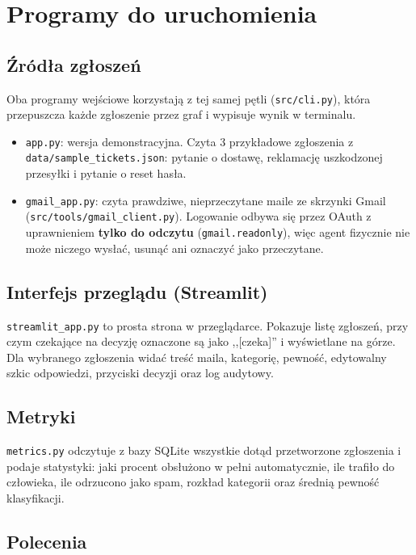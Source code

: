\documentclass[11pt,a4paper]{article}
\newcommand{\plik}[1]{\texttt{#1}}
\begin{document}
\section{Programy do uruchomienia}

\subsection{Źródła zgłoszeń}

Oba programy wejściowe korzystają z tej samej pętli (\plik{src/cli.py}),
która przepuszcza każde zgłoszenie przez graf i wypisuje wynik w terminalu.

\begin{itemize}
  \item \plik{app.py}: wersja demonstracyjna. Czyta 3 przykładowe
        zgłoszenia z \plik{data/sample_tickets.json}: pytanie o dostawę,
        reklamację uszkodzonej przesyłki i pytanie o reset hasła.
  \item \plik{gmail\_app.py}: czyta prawdziwe, nieprzeczytane maile ze
        skrzynki Gmail (\plik{src/tools/gmail\_client.py}). Logowanie odbywa
        się przez OAuth z uprawnieniem \textbf{tylko do odczytu}
        (\texttt{gmail.readonly}), więc agent fizycznie nie może niczego
        wysłać, usunąć ani oznaczyć jako przeczytane.
\end{itemize}

\subsection{Interfejs przeglądu (Streamlit)}

\plik{streamlit\_app.py} to prosta strona w przeglądarce. Pokazuje listę
zgłoszeń, przy czym czekające na decyzję oznaczone są jako ,,[czeka]'' i
wyświetlane na górze. Dla wybranego zgłoszenia widać treść maila, kategorię,
pewność, edytowalny szkic odpowiedzi, przyciski decyzji oraz log audytowy.

\subsection{Metryki}

\plik{metrics.py} odczytuje z bazy SQLite wszystkie dotąd przetworzone
zgłoszenia i podaje statystyki: jaki procent obsłużono w pełni automatycznie,
ile trafiło do człowieka, ile odrzucono jako spam, rozkład kategorii oraz
średnią pewność klasyfikacji.

\subsection{Polecenia}
\end{document}
